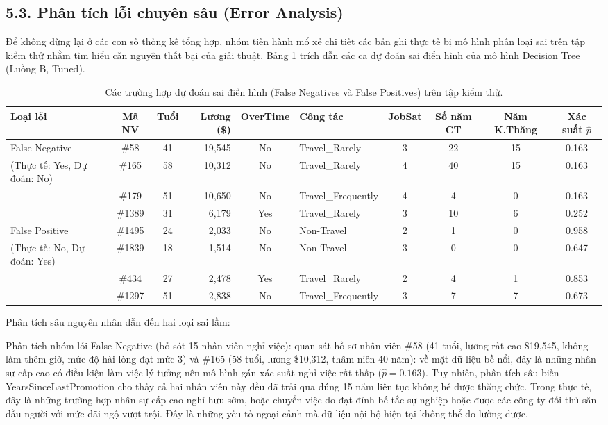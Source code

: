 \documentclass[12pt,a4paper]{article}
\begin{document}
\subsection{5.3. Phân tích lỗi chuyên sâu (Error Analysis)}
Để không dừng lại ở các con số thống kê tổng hợp, nhóm tiến hành mổ xẻ chi tiết các bản ghi thực tế bị mô hình phân loại sai trên tập kiểm thử nhằm tìm hiểu căn nguyên thất bại của giải thuật. Bảng \ref{tab:error_cases} trích dẫn các ca dự đoán sai điển hình của mô hình Decision Tree (Luồng B, Tuned).

\begin{table}[H]
\centering
\caption{Các trường hợp dự đoán sai điển hình (False Negatives và False Positives) trên tập kiểm thử.}
\label{tab:error_cases}
\footnotesize
\begin{tabular}{|l|c|c|r|c|l|c|c|c|c|}
\hline
\textbf{Loại lỗi} & \textbf{Mã NV} & \textbf{Tuổi} & \textbf{Lương (\$)} & \textbf{OverTime} & \textbf{Công tác} & \textbf{JobSat} & \textbf{Số năm CT} & \textbf{Năm K.Thăng} & \textbf{Xác suất $\hat{p}$} \\
\hline
False Negative & \#58 & 41 & 19,545 & No & Travel\_Rarely & 3 & 22 & 15 & 0.163 \\
(Thực tế: Yes, Dự đoán: No) & \#165 & 58 & 10,312 & No & Travel\_Rarely & 4 & 40 & 15 & 0.163 \\
 & \#179 & 51 & 10,650 & No & Travel\_Frequently & 4 & 4 & 0 & 0.163 \\
 & \#1389 & 31 & 6,179 & Yes & Travel\_Rarely & 3 & 10 & 6 & 0.252 \\
\hline
False Positive & \#1495 & 24 & 2,033 & No & Non-Travel & 2 & 1 & 0 & 0.958 \\
(Thực tế: No, Dự đoán: Yes) & \#1839 & 18 & 1,514 & No & Non-Travel & 3 & 0 & 0 & 0.647 \\
 & \#434 & 27 & 2,478 & Yes & Travel\_Rarely & 2 & 4 & 1 & 0.853 \\
 & \#1297 & 51 & 2,838 & No & Travel\_Frequently & 3 & 7 & 7 & 0.673 \\
\hline
\end{tabular}
\end{table}

Phân tích sâu nguyên nhân dẫn đến hai loại sai lầm:

Phân tích nhóm lỗi False Negative (bỏ sót 15 nhân viên nghỉ việc): quan sát hồ sơ nhân viên \#58 (41 tuổi, lương rất cao \$19,545, không làm thêm giờ, mức độ hài lòng đạt mức 3) và \#165 (58 tuổi, lương \$10,312, thâm niên 40 năm): về mặt dữ liệu bề nổi, đây là những nhân sự cấp cao có điều kiện làm việc lý tưởng nên mô hình gán xác suất nghỉ việc rất thấp ($\hat{p} = 0.163$). Tuy nhiên, phân tích sâu biến YearsSinceLastPromotion cho thấy cả hai nhân viên này đều đã trải qua đúng 15 năm liên tục không hề được thăng chức. Trong thực tế, đây là những trường hợp nhân sự cấp cao nghỉ hưu sớm, hoặc chuyển việc do đạt đỉnh bế tắc sự nghiệp hoặc được các công ty đối thủ săn đầu người với mức đãi ngộ vượt trội. Đây là những yếu tố ngoại cảnh mà dữ liệu nội bộ hiện tại không thể đo lường được.
\end{document}
